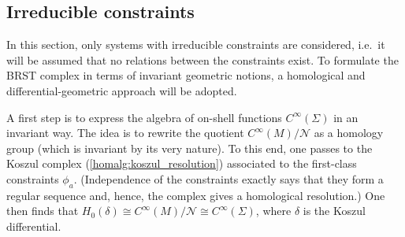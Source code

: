 \subsection{Irreducible constraints}\label{section:irreducible_constraints}

    In this section, only systems with irreducible constraints are considered, i.e.~it will be assumed that no relations between the constraints exist. To formulate the BRST complex in terms of invariant geometric notions, a homological and differential-geometric approach will be adopted.

    A first step is to express the algebra of on-shell functions $C^\infty(\Sigma)$ in an invariant way. The idea is to rewrite the quotient $C^\infty(M)/\mathcal{N}$ as a homology group (which is invariant by its very nature). To this end, one passes to the Koszul complex (\cref{homalg:koszul_resolution}) associated to the first-class constraints $\phi_a$. (Independence of the constraints exactly says that they form a regular sequence and, hence, the complex gives a homological resolution.) One then finds that $H_0(\delta)\cong C^\infty(M)/\mathcal{N}\cong C^\infty(\Sigma)$, where $\delta$ is the Koszul differential.

